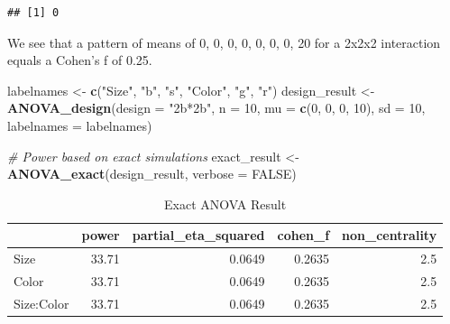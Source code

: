 \documentclass[]{book}
\newenvironment{Shaded}{\begin{snugshade}}{\end{snugshade}}
\newcommand{\CommentTok}[1]{\textcolor[rgb]{0.56,0.35,0.01}{\textit{#1}}}
\newcommand{\DataTypeTok}[1]{\textcolor[rgb]{0.13,0.29,0.53}{#1}}
\newcommand{\DecValTok}[1]{\textcolor[rgb]{0.00,0.00,0.81}{#1}}
\newcommand{\KeywordTok}[1]{\textcolor[rgb]{0.13,0.29,0.53}{\textbf{#1}}}
\newcommand{\NormalTok}[1]{#1}
\newcommand{\OperatorTok}[1]{\textcolor[rgb]{0.81,0.36,0.00}{\textbf{#1}}}
\newcommand{\OtherTok}[1]{\textcolor[rgb]{0.56,0.35,0.01}{#1}}
\newcommand{\StringTok}[1]{\textcolor[rgb]{0.31,0.60,0.02}{#1}}
\begin{document}
\begin{verbatim}
## [1] 0
\end{verbatim}

We see that a pattern of means of 0, 0, 0, 0, 0, 0, 0, 20 for a 2x2x2 interaction equals a Cohen's f of 0.25.

\begin{Shaded}
\begin{Highlighting}[]
\NormalTok{labelnames <-}\StringTok{ }\KeywordTok{c}\NormalTok{(}\StringTok{"Size"}\NormalTok{, }\StringTok{"b"}\NormalTok{, }\StringTok{"s"}\NormalTok{, }\StringTok{"Color"}\NormalTok{, }\StringTok{"g"}\NormalTok{, }\StringTok{"r"}\NormalTok{)}
\NormalTok{design_result <-}\StringTok{ }\KeywordTok{ANOVA_design}\NormalTok{(}\DataTypeTok{design =} \StringTok{"2b*2b"}\NormalTok{, }
                              \DataTypeTok{n =} \DecValTok{10}\NormalTok{, }
                              \DataTypeTok{mu =} \KeywordTok{c}\NormalTok{(}\DecValTok{0}\NormalTok{, }\DecValTok{0}\NormalTok{, }\DecValTok{0}\NormalTok{, }\DecValTok{10}\NormalTok{), }
                              \DataTypeTok{sd =} \DecValTok{10}\NormalTok{, }
                              \DataTypeTok{labelnames =}\NormalTok{ labelnames) }

\CommentTok{# Power based on exact simulations}
\NormalTok{exact_result <-}\StringTok{ }\KeywordTok{ANOVA_exact}\NormalTok{(design_result,}
                            \DataTypeTok{verbose =} \OtherTok{FALSE}\NormalTok{)}
\end{Highlighting}
\end{Shaded}

\begin{table}[t]

\caption{\label{tab:unnamed-chunk-153}Exact ANOVA Result}
\centering
\begin{tabular}{l|r|r|r|r}
\hline
  & power & partial\_eta\_squared & cohen\_f & non\_centrality\\
\hline
Size & 33.71 & 0.0649 & 0.2635 & 2.5\\
\hline
Color & 33.71 & 0.0649 & 0.2635 & 2.5\\
\hline
Size:Color & 33.71 & 0.0649 & 0.2635 & 2.5\\
\hline
\end{tabular}
\end{table}

\begin{Shaded}
\end{Shaded}
\end{document}
